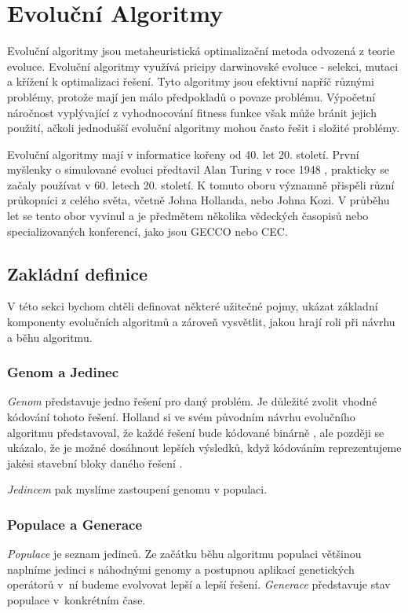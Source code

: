\chapter{Evoluční Algoritmy}

Evoluční algoritmy jsou metaheuristická optimalizační metoda odvozená z teorie evoluce. Evoluční algoritmy využívá pricipy darwinovské evoluce - selekci, mutaci a křížení k optimalizaci řešení. Tyto algoritmy jsou efektivní napříč různými problémy, protože mají jen málo předpokladů o povaze problému. Výpočetní náročnost vyplývající z vyhodnocování fitness funkce však může bránit jejich použití, ačkoli jednodušší evoluční algoritmy mohou často řešit i složité problémy.

Evoluční algoritmy mají v informatice kořeny od 40. let 20. století. První myšlenky o simulované evoluci předtavil Alan Turing v roce 1948 \cite{Turing1948}, prakticky se začaly používat v 60. letech 20. století. K tomuto oboru významně přispěli různí průkopníci z celého světa, včetně Johna Hollanda, nebo Johna Kozi. V průběhu let se tento obor vyvinul a je předmětem několika vědeckých časopisů nebo specializovaných konferencí, jako jsou GECCO nebo CEC. 

\section{Zakládní definice}
V této sekci bychom chtěli definovat některé užitečné pojmy, ukázat základní komponenty evolučních algoritmů a zároveň vysvětlit, jakou hrají roli při návrhu a běhu algoritmu.

\subsection{Genom a Jedinec}
\emph{Genom} představuje jedno řešení pro daný problém. Je důležité zvolit vhodné kódování tohoto řešení. Holland si ve svém původním návrhu evolučního algoritmu představoval, že každé řešení bude kódované binárně \cite{Holland1992}, ale později se ukázalo, že je možné dosáhnout lepších výsledků, když kódováním reprezentujeme jakési stavební bloky daného řešení \citet{Jones1995Crossover}.

\emph{Jedincem} pak myslíme zastoupení genomu v populaci.

\subsection{Populace a Generace}
\emph{Populace} je seznam jedinců. Ze začátku běhu algoritmu populaci většinou naplníme jedinci s náhodnými genomy a postupnou aplikací genetických operátorů v~ní budeme evolvovat lepší a lepší řešení. \emph{Generace} představuje stav populace v~konkrétním čase.

